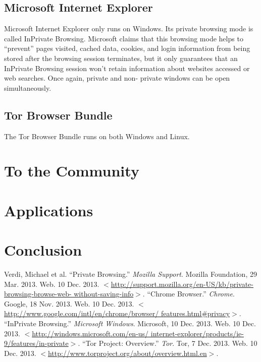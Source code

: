 \documentclass[pdftex,letterpaper,11pt]{article}
\begin{document}
    \subsection{Microsoft Internet Explorer}
    Microsoft Internet Explorer only runs on Windows. Its private browsing mode
    is called InPrivate Browsing. Microsoft claims that this browsing mode
    helps to ``prevent'' pages visited, cached data, cookies, and login
    information from being stored after the browsing session terminates, but it
    only guarantees that an InPrivate Browsing session won't retain information
    about websites accessed or web searches. Once again, private and non-
    private windows can be open simultaneously.\cite{ie13}

    \subsection{Tor Browser Bundle}
    The Tor Browser Bundle runs on both Windows and Linux. 
  \fi

  \section{To the Community}

  \section{Applications}

  \section{Conclusion}

  \begin{thebibliography}{9}
      Verdi, Michael et al. ``Private Browsing.'' \emph{Mozilla Support}. 
      Mozilla Foundation, 29 Mar. 2013. Web. 10 Dec. 2013. 
      $<$\url{http://support.mozilla.org/en-US/kb/private-browsing-browse-web-
      without-saving-info}$>$.
      ``Chrome Browser.'' \emph{Chrome}. Google, 18 Nov. 2013. Web. 10 Dec. 
      2013. $<$\url{http://www.google.com/intl/en/chrome/browser/
      features.html#privacy}$>$.
      ``InPrivate Browsing.'' \emph{Microsoft Windows}. Microsoft, 10 Dec. 
      2013. Web. 10 Dec. 2013. $<$\url{http://windows.microsoft.com/en-us/
      internet-explorer/products/ie-9/features/in-private}$>$.
      ``Tor Project: Overview.'' \emph{Tor}. Tor, 7 Dec. 2013. Web. 10 Dec. 
      2013. $<$\url{http://www.torproject.org/about/overview.html.en}$>$. 

  \end{thebibliography}
\end{document}
